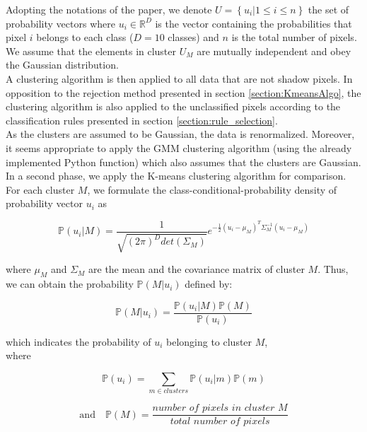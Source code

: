 \documentclass{siamart171218}
\begin{document}
Adopting the notations of the paper, we denote  $U = \left\{ u_i |1 \le i \le n 
\right\}$ the set of probability vectors where $u_i \in \mathbb{R}^{D}$ is the vector containing the probabilities that pixel $i$ belongs to each class ($D = 10$ classes) and $n$ is the total number of pixels. We assume that the elements in cluster $U_M$ are mutually independent and obey the Gaussian distribution. \\
A clustering algorithm is then applied to all data that are not shadow pixels. In opposition to the rejection method presented in section \ref{section:KmeansAlgo}, the clustering algorithm is also applied to the unclassified pixels according to the classification rules presented in section \ref{section:rule_selection}. \\
As the clusters are assumed to be Gaussian, the data is renormalized. Moreover, it seems appropriate to apply the GMM clustering algorithm (using the already implemented Python function) which also assumes that the clusters are Gaussian. In a second phase, we apply the K-means clustering algorithm for comparison. \\

For each cluster $M$, we formulate the class-conditional-probability density of probability vector $u_i$ as 


\begin{equation}
    \mathbb{P}(u_i|M) = \frac{1}{\sqrt{(2\pi)^D det(\Sigma_M)}} e^{-\frac{1}{2}(u_i -\mu_M)^T \Sigma_M^{-1}(u_i - \mu_M)} 
    \label{class_condi_pb1}
\end{equation}

where $\mu_M$ and $\Sigma_M$ are the mean and the covariance matrix of cluster $M$. Thus, we can obtain the probability $\mathbb{P}(M|u_i)$ defined by:

\begin{equation}
    \mathbb{P}(M|u_i) = \frac{\mathbb{P}(u_i|M)\mathbb{P}(M)}{\mathbb{P}(u_i)}
    \label{class_condi_pb2}
\end{equation}

which indicates the probability of $u_i$ belonging to cluster $M$, \\
where 

\hspace{-0.9cm}\begin{minipage}{.40\linewidth}
\begin{equation}
    \mathbb{P}(u_i) =  \sum_{m \in clusters} \mathbb{P}(u_i|m)\mathbb{P}(m)
    \label{precision1}
\end{equation}
\end{minipage} 
\begin{minipage}{.56\linewidth}
\begin{equation}
    \text{and~~~}
    \mathbb{P}(M) = \frac{\textit{number of pixels in cluster M}}{\textit{total number of pixels}}
    \label{precision2}
\end{equation}
\end{minipage} \hfill
\bigskip
\end{document}
